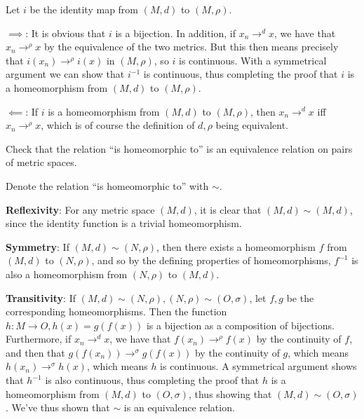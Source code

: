 \begin{solution}
    
    Let $i$ be the identity map from $(M, d)$ to $(M, \rho)$.

    $\implies$: It is obvious that $i$ is a bijection.
    In addition, if $x_n \rightarrow^{d} x$, we have that $x_n \rightarrow^{\rho} x$ by the equivalence of the two metrics.
    But this then means precisely that $i(x_n) \rightarrow^{\rho} i(x)$ in $(M, \rho)$, so $i$ is continuous.
    With a symmetrical argument we can show that $i^{-1}$ is continuous, thus completing the proof that $i$ is a homeomorphism from $(M, d)$ to $(M, \rho)$.

    $\impliedby$: If $i$ is a homeomorphism from $(M, d)$ to $(M, \rho)$, then $x_n \rightarrow^{d} x$ iff $x_n \rightarrow^{\rho} x$, which is of course the definition of $d, \rho$ being equivalent.
\end{solution}

\begin{exercise}{44}
    Check that the relation ``is homeomorphic to'' is an equivalence relation on pairs of metric spaces.
\end{exercise}

\begin{solution}
    
    Denote the relation ``is homeomorphic to'' with $\sim$.
    
    \textbf{Reflexivity}: For any metric space $(M, d)$, it is clear that $(M, d) \sim (M, d)$, since the identity function is a trivial homeomorphism.

    \textbf{Symmetry}: If $(M, d) \sim (N, \rho)$, then there exists a homeomorphism $f$ from $(M, d)$ to $(N, \rho)$, and so by the defining properties of homeomorphisms, $f^{-1}$ is also a homeomorphism from $(N, \rho)$ to $(M, d)$.

    \textbf{Transitivity}: If $(M, d) \sim (N, \rho), (N, \rho) \sim (O, \sigma)$, let $f, g$ be the corresponding homeomorphisms.
    Then the function $h: M \rightarrow O, h(x) = g(f(x))$ is a bijection as a composition of bijections.
    Furthermore, if $x_n \rightarrow^{d} x$, we have that $f(x_n) \rightarrow^{\rho} f(x)$ by the continuity of $f$, and then that $g(f(x_n)) \rightarrow^{\sigma} g(f(x))$ by the continuity of $g$, which means $h(x_n) \rightarrow^{\sigma} h(x)$, which means $h$ is continuous.
    A symmetrical argument shows that $h^{-1}$ is also continuous, thus completing the proof that $h$ is a homeomorphism from $(M, d)$ to $(O, \sigma)$, thus showing that $(M, d) \sim (O, \sigma)$.
    We've thus shown that $\sim$ is an equivalence relation.
\end{solution}

